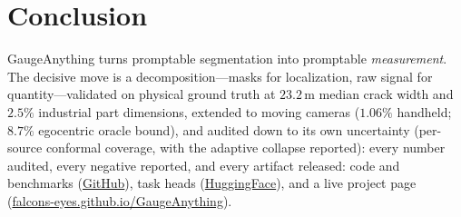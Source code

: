 \documentclass[11pt]{article}
\newcommand{\ours}{GaugeAnything}
\newcommand{\um}{\,\textmu m}
\begin{document}
\section{Conclusion}
\ours{} turns promptable segmentation into promptable \emph{measurement}. The decisive move
is a decomposition---masks for localization, raw signal for quantity---validated on physical
ground truth at $23.2$\um{} median crack width and $2.5\%$ industrial part dimensions,
extended to moving cameras ($1.06\%$ handheld; $8.7\%$ egocentric oracle bound), and
audited down to its own uncertainty (per-source conformal coverage, with the adaptive
collapse reported): every number audited, every negative reported, and every artifact
released: code and
benchmarks (\href{https://github.com/falcons-eyes/GaugeAnything}{GitHub}), task heads
(\href{https://huggingface.co/James-joobs/GaugeAnything}{HuggingFace}), and a live project
page (\href{https://falcons-eyes.github.io/GaugeAnything/}{falcons-eyes.github.io/GaugeAnything}).



\end{document}
